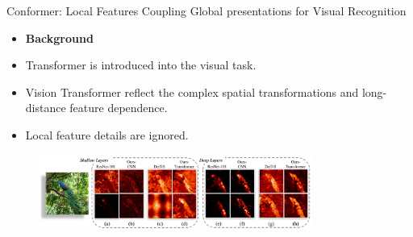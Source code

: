 \documentclass[CJK,aspectratio=169]{beamer}  %
\begin{document}
	\begin{frame}
		Conformer: Local Features Coupling Global presentations for Visual Recognition\textcolor{blue}{\citep{peng2021conformer}}
		\begin{itemize}
			\item \textbf{Background}
			\item[\checkmark]
			Transformer is introduced into the visual task. 
			
			\item[\checkmark]
			Vision Transformer reflect the complex spatial transformations and long-distance feature dependence.
			
			\item[\checkmark]
			Local feature details are ignored.
		\end{itemize}
		
		\begin{figure}[htbp]
			\begin{center}
				\includegraphics[width=0.8\textwidth]{picture/LLIE/Conformer/Comparison of feature maps of CNN (ResNet-101)}
			\end{center}
		\end{figure}
		
	\end{frame}
	
\end{document}
